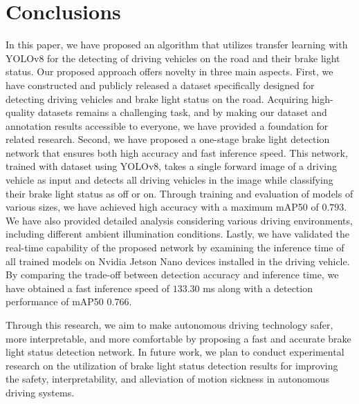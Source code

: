 \section{Conclusions}
\label{sec:conclusions}


In this paper, we have proposed an algorithm that utilizes transfer learning with YOLOv8 for the detecting of driving vehicles on the road and their brake light status.
Our proposed approach offers novelty in three main aspects.
First, we have constructed and publicly released a dataset specifically designed for detecting driving vehicles and brake light status on the road.
Acquiring high-quality datasets remains a challenging task, and by making our dataset and annotation results accessible to everyone, we have provided a foundation for related research.
Second, we have proposed a one-stage brake light detection network that ensures both high accuracy and fast inference speed.
This network, trained with dataset using YOLOv8, takes a single forward image of a driving vehicle as input and detects all driving vehicles in the image while classifying their brake light status as off or on.
Through training and evaluation of models of various sizes, we have achieved high accuracy with a maximum mAP50 of $0.793$.
We have also provided detailed analysis considering various driving environments, including different ambient illumination conditions.
Lastly, we have validated the real-time capability of the proposed network by examining the inference time of all trained models on Nvidia Jetson Nano devices installed in the driving vehicle.
By comparing the trade-off between detection accuracy and inference time, we have obtained a fast inference speed of $133.30$ ms along with a detection performance of mAP50 $0.766$.

Through this research, we aim to make autonomous driving technology safer, more interpretable, and more comfortable by proposing a fast and accurate brake light status detection network.
In future work, we plan to conduct experimental research on the utilization of brake light status detection results for improving the safety, interpretability, and alleviation of motion sickness in autonomous driving systems.
